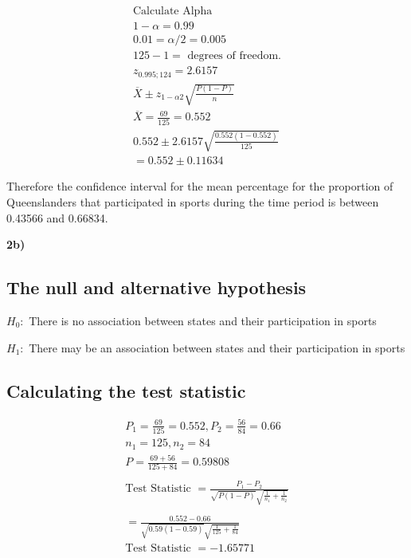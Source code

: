 \documentclass[oneside, a4paper]{article}
\begin{document}
\begin{equation*}
    \begin{split}
        \text{Calculate Alpha} \\
        1 - \alpha = 0.99 \\
        0.01 = \alpha / 2 = 0.005 \\
        125 - 1 = \text{ degrees of freedom.} \\
        z_{0.995;124} =  2.6157 \\
        \overline{X} \pm z_{1-\alpha2}\sqrt{\frac{P(1-P)}{n}}  \\
        \overline{X} = \frac{69}{125} = 0.552 \\
        0.552 \pm 2.6157 \sqrt{\frac{0.552(1-0.552)}{125}} \\
        = 0.552 \pm 0.11634
    \end{split}
\end{equation*}

Therefore the confidence interval for the mean percentage for the proportion of Queenslanders that participated in sports during the time period is between 0.43566 and 0.66834.

\textbf{2b)}

\subsection{The null and alternative hypothesis}

$H_0:$ There is no association between states and their participation in sports

$H_1:$ There may be an association between states and their participation in sports


\subsection{Calculating the test statistic}

\begin{equation*}
    \begin{split}
        P_1 = \frac{69}{125} = 0.552, P_2 = \frac{56}{84} = 0.66 \\
        n_1 = 125, n_2 = 84 \\
        P = \frac{69+56}{125+84} = 0.59808 \\ \\
        \text{Test Statistic } = \frac{P_1 - P_2}{\sqrt{P(1-P)} \sqrt{\frac{1}{n_1}+{\frac{1}{n_2}}}} \\ \\
        = \frac{0.552 - 0.66}{\sqrt{0.59(1-0.59)} \sqrt{\frac{1}{125}+{\frac{1}{84}}}} \\
        \text{Test Statistic } = -1.65771
    \end{split}
\end{equation*}
\end{document}
